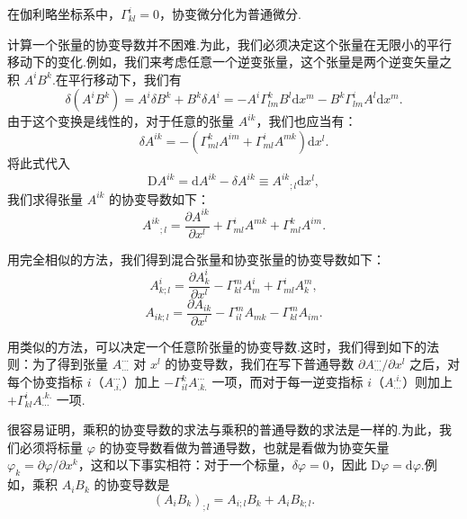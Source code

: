在伽利略坐标系中，$\Gamma^i_{kl}=0$，协变微分化为普通微分.

计算一个张量的协变导数并不困难.为此，我们必须决定这个张量在无限小的平行移动下的变化.例如，我们来考虑任意一个逆变张量，这个张量是两个逆变矢量之积 $A^iB^k$.在平行移动下，我们有
\begin{equation*}
  \delta(A^iB^k)=A^i\delta B^k+B^k\delta A^i
  =-A^i\Gamma^k_{lm}B^l\mathrm{d}x^m
  -B^k\Gamma^i_{lm}A^l\mathrm{d}x^m.
\end{equation*}
由于这个变换是线性的，对于任意的张量 $A^{ik}$，我们也应当有：
\begin{equation}
  \delta A^{ik}=-\left(\Gamma^k_{ml}A^{im}
  +\Gamma^i_{ml}A^{mk}\right)\mathrm{d}x^l.
\end{equation}
将此式代入
\begin{equation*}
  \mathrm{D}A^{ik}=\mathrm{d}A^{ik}-\delta A^{ik}
  \equiv A^{ik}{}_{;l}\mathrm{d}x^l,
\end{equation*}
我们求得张量 $A^{ik}$ 的协变导数如下：
\begin{equation}
  A^{ik}{}_{;l}=\frac{\partial A^{ik}}{\partial x^l}
  +\Gamma^i_{ml}A^{mk}+\Gamma^k_{ml}A^{im}.
\end{equation}

用完全相似的方法，我们得到混合张量和协变张量的协变导数如下：
\begin{equation}
  A^i_{k;l}=\frac{\partial A^i_k}{\partial x^l}
  -\Gamma^m_{kl}A^i_m+\Gamma^i_{ml}A^m_k,
\end{equation}
\begin{equation}
  A_{ik;l}=\frac{\partial A_{ik}}{\partial x^l}
  -\Gamma^m_{il}A_{mk}-\Gamma^m_{kl}A_{im}.
\end{equation}

用类似的方法，可以决定一个任意阶张量的协变导数.这时，我们得到如下的法则：为了得到张量 $A^{\cdots}_{\cdots}$ 对 $x^l$ 的协变导数，我们在写下普通导数 $\partial A^{\cdots}_{\cdots}/\partial x^l$ 之后，对每个协变指标 $i$（$A^{\cdots}_{.i.}$）加上 $-\Gamma^k_{il}A^{\cdots}_{.k.}$ 一项，而对于每一逆变指标 $i$（$A^{.i.}_{\cdots}$）则加上 $+\Gamma^i_{kl}A^{.k.}_{\cdots}$ 一项.

很容易证明，乘积的协变导数的求法与乘积的普通导数的求法是一样的.为此，我们必须将标量 $\varphi$ 的协变导数看做为普通导数，也就是看做为协变矢量 $\varphi_k=\partial\varphi/\partial x^k$，这和以下事实相符：对于一个标量，$\delta\varphi=0$，因此 $\mathrm{D}\varphi=\mathrm{d}\varphi$.例如，乘积 $A_iB_k$ 的协变导数是
\begin{equation*}
  (A_iB_k)_{;l}=A_{i;l}B_k+A_iB_{k;l}.
\end{equation*}

